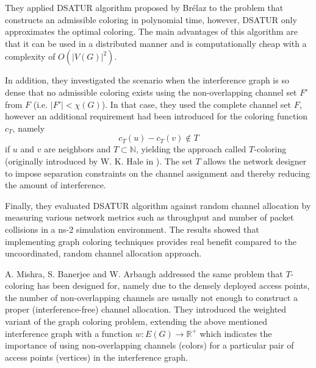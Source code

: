 \documentclass[a4paper, 12pt]{article}
\begin{document}
They applied DSATUR algorithm proposed by Brélaz \cite{dsatur} to the problem that constructs an admissible coloring in polynomial time, however, DSATUR only approximates the optimal coloring. The main advantages of this algorithm are that it can be used in a distributed manner and is computationally cheap with a complexity of $O(|V(G)|^2)$. 

In addition, they investigated the scenario when the interference graph is so dense that no admissible coloring exists using the non-overlapping channel set $F'$ from $F$ (i.e. $|F'| < \chi(G)$). In that case, they used the complete channel set $F$, however an additional requirement had been introduced for the coloring function $c_T$, namely
$$
c_T(u) - c_T(v) \not\in T
$$
if $u$ and $v$ are neighbors and $T \subset \mathbb{N}$, yielding the approach called $T$-coloring (originally introduced by W. K. Hale in \cite{1456167}). The set $T$ allows the network designer to impose separation constraints on the channel assignment and thereby reducing the amount of interference.

Finally, they evaluated DSATUR algorithm against random channel allocation by measuring various network metrics such as throughput and number of packet collisions in a ns-2 simulation environment. The results showed that implementing graph coloring techniques provides real benefit compared to the uncoordinated, random channel allocation approach.

A. Mishra, S. Banerjee and W. Arbaugh \cite{mishra} addressed the same problem that $T$-coloring has been designed for, namely due to the densely deployed access points, the number of non-overlapping channels are usually not enough to construct a proper (interference-free) channel allocation. They introduced the weighted variant of the graph coloring problem, extending the above mentioned interference graph with a function $w\colon E(G) \to \mathbb{R}^+$ which indicates the importance of using non-overlapping channels (colors) for a particular pair of access points (vertices) in the interference graph.
\end{document}
